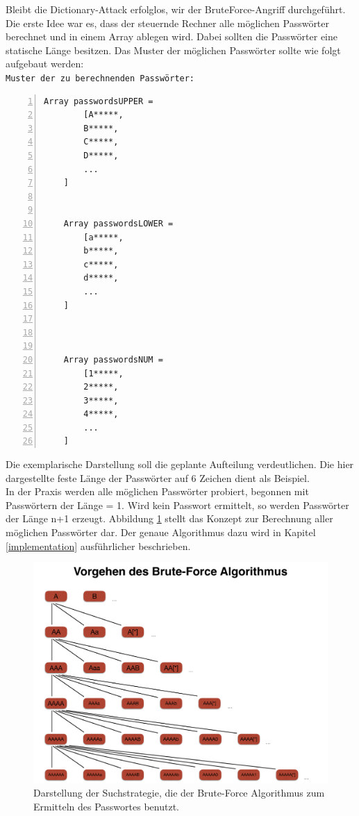 Bleibt die Dictionary-Attack erfolglos, wir der BruteForce-Angriff durchgeführt. \\
Die erste Idee war es, dass der steuernde Rechner alle möglichen Passwörter berechnet und in einem Array ablegen wird. Dabei sollten die Passwörter eine statische Länge besitzen. Das Muster der möglichen Passwörter sollte wie folgt aufgebaut werden: \\
\texttt{Muster der zu berechnenden Passwörter:}
\begin{lstlisting}[basicstyle=\ttfamily,numbers=left,numberstyle=\footnotesize\ttfamily,backgroundcolor=\color{sourcegray}]
	Array passwordsUPPER = 
		[A*****,
	 	B*****,
	 	C*****,
	 	D*****,
	 	...
	]
	
	
	Array passwordsLOWER = 
		[a*****,
	 	b*****,
	 	c*****,
	 	d*****,
		...
	]
	
	

	Array passwordsNUM = 
		[1*****,
	 	2*****,
	 	3*****,
	 	4*****,
		...
	]
\end{lstlisting}

Die exemplarische Darstellung soll die geplante Aufteilung verdeutlichen. Die hier dargestellte feste Länge der Passwörter auf 6 Zeichen dient als Beispiel. \\

In der Praxis werden alle möglichen Passwörter probiert, begonnen mit Passwörtern der Länge = 1. Wird kein Passwort ermittelt, so werden Passwörter der Länge n+1 erzeugt. Abbildung \ref{fig:schemaBruteForce} stellt das Konzept zur Berechnung aller möglichen Passwörter dar. Der genaue Algorithmus dazu wird in Kapitel \ref{implementation} ausführlicher beschrieben. \\
\begin{figure}[!ht]
	\centering
		\includegraphics[natwidth=1200pt, natheight=349pt, width=1.0\textwidth]{images/SchaubildAlgorithmBreitensuche.pdf}
	\caption{Darstellung der Suchstrategie, die der Brute-Force Algorithmus zum Ermitteln des Passwortes benutzt.}
	\label{fig:schemaBruteForce}
\end{figure}

